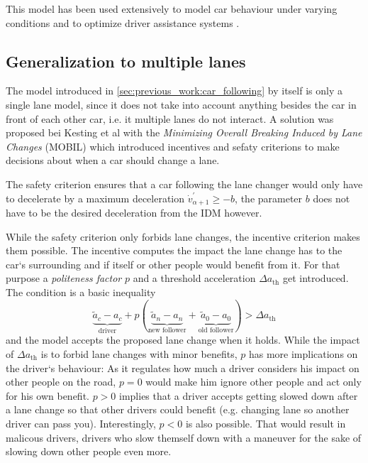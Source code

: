 This model has been used extensively to model car behaviour under varying conditions \cite{FIDM,CAPRANI2016207} and to optimize
driver assistance systems \cite{thesis_acc}.

\subsection{Generalization to multiple lanes}
\label{sec:previous_work:multiple_lanes}
The model introduced in \autoref{sec:previous_work:car_following} by itself is only a single lane model, since it does
not take into account anything besides the car in front of each other car, i.e. it multiple lanes do not interact. A
solution was proposed bei Kesting et al \cite{MOBIL} with the \textit{Minimizing Overall Breaking Induced by Lane
Changes} (MOBIL) which introduced incentives and sefaty criterions to make decisions about when a car should change a
lane.

The safety criterion ensures that a car following the lane changer would only have to decelerate by a maximum
deceleration $\dot v_{\alpha + 1}^\prime \geq -b$, the parameter $b$ does not have to be the desired deceleration from
the IDM however.

While the safety criterion only forbids lane changes, the incentive criterion makes them possible. The incentive
computes the impact the lane change has to the car`s surrounding and if itself or other people would benefit from it.
For that purpose a \textit{politeness factor} $p$ and a threshold acceleration $\Delta a_\text{th}$ get introduced. 
The condition is a basic inequality
\begin{equation}
  \underbrace{\tilde{a}_c - a_c}_\text{driver}
  + p (
  \underbrace{\tilde{a}_n - a_n}_\text{new follower}
  +
  \underbrace{\tilde{a}_0 - a_0}_\text{old follower}
  )
  > \Delta a_\text{th}
\end{equation}
and the model accepts the proposed lane change when it holds. While the impact of $\Delta a_\text{th}$ is to forbid lane
changes with minor benefits, $p$ has more implications on the driver`s behaviour: As it regulates how much a driver
considers his impact on other people on the road, $p=0$ would make him ignore other people and act only for his own
benefit. $p>0$ implies that a driver accepts getting slowed down after a lane change so that other drivers could
benefit (e.g. changing lane so another driver can pass you). Interestingly, $p<0$ is also possible. That would result in
malicous drivers, drivers who slow themself down with a maneuver for the sake of slowing down other people even
more.

